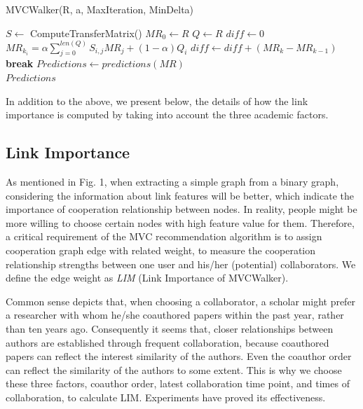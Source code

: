 \documentclass[10pt,journal,compsoc]{IEEEtran}
\newcommand{\algorithmicbreak}{\textbf{break}}
\newcommand{\BREAK}{\State \algorithmicbreak}
\begin{document}
\begin{algorithm}
  \caption{MVCWalker(R, a, MaxIteration, MinDelta)}
  \begin{algorithmic}[1]
    \State $S\leftarrow$ ComputeTransferMatrix()
    \State $MR_{0} \leftarrow R$
    \State $Q \leftarrow R$
        \State $diff \leftarrow 0$
            \State $MR_{k_{i}} = \alpha\sum_{j=0}^{len(Q)} S_{i,j}MR_{j}+(1-\alpha) Q_{i}$
            \State $diff \leftarrow diff +(MR_{k}-MR_{k-1})$
        \EndFor
            \BREAK
        \EndIf
    \EndFor
    \State $Predictions \leftarrow predictions(MR)$\\
    \Return $Predictions$
  \end{algorithmic}
\end{algorithm}

In addition to the above, we present below, the details of how the link importance is computed by taking into account the three academic factors.

\subsection{Link Importance}
As mentioned in Fig. 1, when extracting a simple graph from a binary graph, considering the information about link features will be better, which indicate the importance of cooperation relationship between nodes. In reality, people might be more willing to choose certain nodes with high feature value for them. Therefore, a critical requirement of the MVC recommendation algorithm is to assign cooperation graph edge with related weight, to measure the cooperation relationship strengths between one user and his/her (potential) collaborators. We define the edge weight as \emph{LIM} (Link Importance of MVCWalker).

Common sense depicts that, when choosing a collaborator, a scholar might prefer a researcher with whom he/she coauthored papers within the past year, rather than ten years ago. Consequently it seems that, closer relationships between authors are established through frequent collaboration, because coauthored papers can reflect the interest similarity of the authors. Even the coauthor order can reflect the similarity of the authors to some extent. This is why we choose these three factors, coauthor order, latest collaboration time point, and times of collaboration, to calculate LIM. Experiments have proved its effectiveness.
\end{document}

